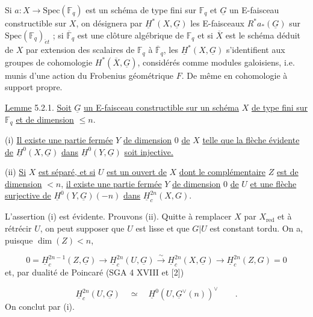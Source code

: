 
Si $a : X \longrightarrow \mathrm{Spec}(\mathbb{F}_q)$ est un schéma de type fini sur $\mathbb{F}_q$ et $\underline{G}$ un E-faisceau constructible sur $X$, on désignera par $\underline{H}^*(X,\underline{G})$ les E-faisceaux $R^*a_*(\underline{G})$ sur $\mathrm{Spec}(\mathbb{F}_q)_{\acute{e}t}$ ; si $\overline{\mathbb{F}}_q$ est une clôture algébrique de $\mathbb{F}_q$ et si $\overline{X}$ est le schéma déduit de $X$ par extension des scalaires de $\mathbb{F}_q$ à $\overline{\mathbb{F}}_q$, les $\underline{H}^*(X,\underline{G})$ s'identifient aux groupes de cohomologie $H^*(\overline{X},\underline{G})$, considérés comme modules galoisiens, i.e. munis d'une action du Frobenius géométrique $F$. De même en cohomologie à support propre.

\underline{Lemme} 5.2.1. \underline{Soit} $\underline{G}$ \underline{un E-faisceau constructible sur un schéma} $X$ \underline{de type fini sur} $\mathbb{F}_q$ \underline{et de dimension} $\leq n$.

(i) \underline{Il existe une partie fermée} $Y$ \underline{de dimension} $0$ \underline{de} $X$ \underline{telle que la flèche évidente de} $\underline{H}^0(X,\underline{G})$ \underline{dans} $\underline{H}^0(Y,\underline{G})$ \underline{soit injective.}

(ii) \underline{Si} $X$ \underline{est séparé, et si} $U$ \underline{est un ouvert de} $X$ \underline{dont le complémentaire} $Z$ \underline{est de dimension} $< n$, \underline{il existe une partie fermée} $Y$ \underline{de dimension} $0$ \underline{de} $U$ \underline{et une flèche surjective de} $\underline{H}^0(Y,\underline{G})(-n)$ \underline{dans} $\underline{H}^{2n}_c(X,G)$.

L'assertion (i) est évidente. Prouvons (ii). Quitte à remplacer $X$ par $X_{\mathrm{red}}$ et à rétrécir $U$, on peut supposer que $U$ est lisse et que $G|U$ est constant tordu. On a, puisque $\dim(Z) < n$,

\begin{equation*}
0 = \underline{H}^{2n-1}_c(Z,\underline{G}) \longrightarrow \underline{H}^{2n}_c(U,\underline{G}) \stackrel{\sim}{\longrightarrow} \underline{H}^{2n}_c(X,\underline{G}) \longrightarrow \underline{H}^{2n}_c(Z,G) = 0
\end{equation*}
et, par dualité de Poincaré (SGA 4 XVIII et [2])

\begin{equation*}
\underline{H}^{2n}_c(U,\underline{G}) \quad \simeq \quad \underline{H}^0(U,\underline{G}^{\vee}(n))^{\vee} \qquad .
\end{equation*}
On conclut par (i).


